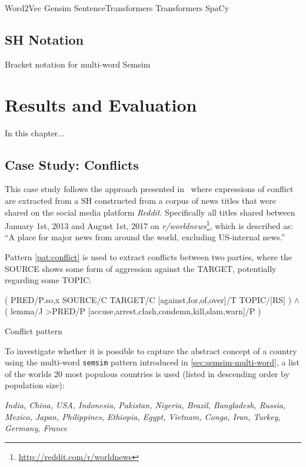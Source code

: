 \documentclass[11pt]{scrreprt}
\begin{document}
Word2Vec
Gensim
SentenceTransformers
Transformers
SpaCy




\section{SH Notation}
Bracket notation for multi-word Semsim



\chapter{Results and Evaluation}
In this chapter...

\section{Case Study: Conflicts}
This case study follows the approach presented in \cite[p.~22]{menezes_semantic_2021} where expressions of conflict are extracted from a SH constructed from a corpus of news titles that were shared on the social media platform \textit{Reddit}. Specifically all titles shared between January 1st, 2013 and August 1st, 2017 on \textit{r/worldnews}\footnote{\url{http://reddit.com/r/worldnews}}, which is described as: “A place for major news from around the world, excluding US-internal news.”

Pattern \ref{pat:conflict} is used to extract conflicts between two parties, where the \textsf{SOURCE} shows some form of aggression against the \textsf{TARGET}, potentially regarding some \textsf{TOPIC}:

\begin{pattern}
  \normalfont\sffamily
  \centering
  ( PRED/P.{so,x} SOURCE/C TARGET/C [against,for,of,over]/T TOPIC/[RS] ) \(\wedge\)\\ ( lemma/J >PRED/P [accuse,arrest,clash,condemn,kill,slam,warn]/P )
  \caption{Conflict pattern}
  \label{pat:conflict}
\end{pattern}



To investigate whether it is possible to capture the abstract concept of a country using the multi-word \texttt{semsim} pattern introduced in \ref{sec:semsim-multi-word}, a list of the worlds 20 most populous countries \cite{wiki_list_of_countries} is used (listed in descending order by population size):


\textit{India, China, USA, Indonesia, Pakistan, Nigeria, Brazil, Bangladesh, Russia, Mexico, Japan, Philippines, Ethiopia, Egypt, Vietnam, Congo, Iran, Turkey, Germany, France}
\end{document}
